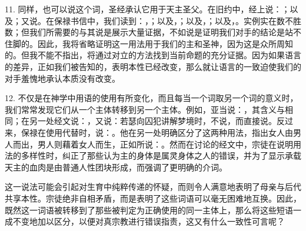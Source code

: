 11. 同样，也可以说这个词，圣经承认它用于天主圣父。在旧约中，经上说：；以及；又说。在保禄书信中，我们读到：，；以及，；以及，；以及，。实例实在数不胜数；但我们所需要的与其说是展示大量证据，不如说是证明我们对手的结论是站不住脚的。因此，我将省略证明这一用法用于我们的主和圣神，因为这是众所周知的。但我不能不指出，将通过对立的方法找到当前命题的充分证据。因为如果语言的差异，正如我们被告知的，表明本性已经改变，那么就让语言的一致迫使我们的对手羞愧地承认本质没有改变。\par

12. 不仅是在神学中用语的使用有所变化，而且每当一个词取另一个词的意义时，我们常常发现它们从一个主体转移到另一个主体。例如，亚当说：，其含义与相同；在另一处经文说：，又说：若瑟向囚犯讲解梦境时，不说，而直接说。反过来，保禄在使用代替时，说：。他在另一处明确区分了这两种用法，指出女人由男人而出，男人则藉着女人而生，正如所说：。然而在讨论的经文中，宗徒在说明用法的多样性时，纠正了那些认为主的身体是属灵身体之人的错误，并为了显示承载天主的血肉是由普通人性团块形成，而强调了更明确的介词。\par

这一说法可能会引起对生育中纯粹传递的怀疑，而则令人满意地表明了母亲与后代共享本性。宗徒绝非自相矛盾，而是表明了这些词语可以毫无困难地互换。因此，既然这一词语被转移到了那些被判定为正确使用的同一主体上，那么将这些短语一成不变地加以区分，以便对真宗教进行错误指责，这又有什么一致性可言呢？\par


